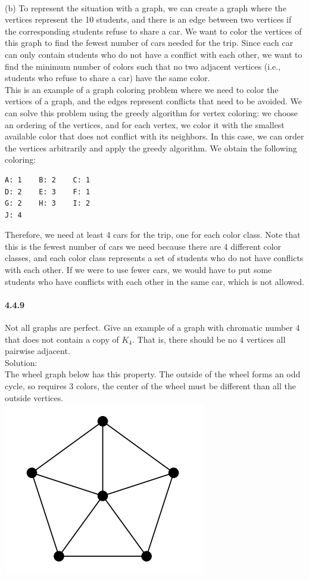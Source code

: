 \documentclass{article}
\begin{document}
\\
(b) To represent the situation with a graph, we can create a graph where the vertices represent the 10 students, and there is an edge between two vertices if the corresponding students refuse to share a car. We want to color the vertices of this graph to find the fewest number of cars needed for the trip. Since each car can only contain students who do not have a conflict with each other, we want to find the minimum number of colors such that no two adjacent vertices (i.e., students who refuse to share a car) have the same color.
\\
This is an example of a graph coloring problem where we need to color the vertices of a graph, and the edges represent conflicts that need to be avoided. We can solve this problem using the greedy algorithm for vertex coloring: we choose an ordering of the vertices, and for each vertex, we color it with the smallest available color that does not conflict with its neighbors. In this case, we can order the vertices arbitrarily and apply the greedy algorithm. We obtain the following coloring:
\begin{lstlisting}
A: 1    B: 2    C: 1
D: 2    E: 3    F: 1
G: 2    H: 3    I: 2
J: 4
\end{lstlisting}
Therefore, we need at least 4 cars for the trip, one for each color class. Note that this is the fewest number of cars we need because there are 4 different color classes, and each color class represents a set of students who do not have conflicts with each other. If we were to use fewer cars, we would have to put some students who have conflicts with each other in the same car, which is not allowed.
\paragraph{4.4.9}
Not all graphs are perfect. Give an example of a graph with chromatic number 4 that does not contain a copy of $K_4$. That is, there should be no 4 vertices all pairwise adjacent.\\
Solution:\\
The wheel graph below has this property. The outside of the wheel forms an odd cycle, so requires 3 colors, the center of the wheel must be different than all the outside vertices.\\
\includegraphics{0115}
\end{document}
